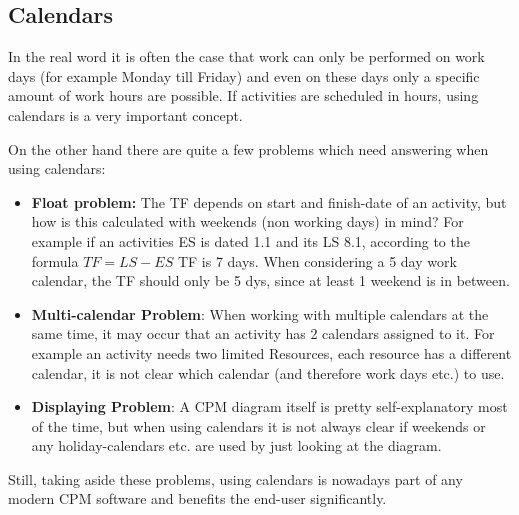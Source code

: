 \subsection{Calendars}

In the real word it is often the case that work can only be performed on work days (for example Monday till Friday) and even on these days only a specific amount of work hours are possible. If activities are scheduled in hours, using calendars is a very important concept.

On the other hand there are quite a few problems which need answering when using calendars:
\begin{itemize}
	\item \textbf{Float problem:} The TF depends on start and finish-date of an activity, but how is this calculated with weekends (non working days) in mind? For example if an activities ES is dated 1.1 and its LS 8.1, according to the formula $TF = LS - ES $ TF is 7 days. When considering a 5 day work calendar, the TF should only be 5 dys, since at least 1 weekend is in between. 
	\item \textbf{Multi-calendar Problem}: When working with multiple calendars at the same time, it may occur that an activity has 2 calendars assigned to it. For example an activity needs two limited Resources, each resource has a different calendar, it is not clear which calendar (and therefore work days etc.) to use. 
	\item \textbf{Displaying Problem}: A CPM diagram itself is pretty self-explanatory most of the time, but when using calendars it is not always clear if weekends or any holiday-calendars etc. are used by just looking at the diagram.
\end{itemize}

Still, taking aside these problems, using calendars is nowadays part of any modern CPM software and benefits the end-user significantly.

